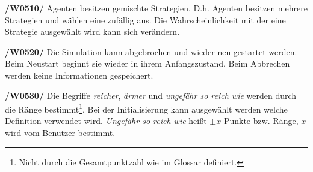 \textbf{/W0510/}
Agenten besitzen gemischte Strategien. D.h. Agenten besitzen mehrere Strategien und wählen eine zufällig aus. Die Wahrscheinlichkeit mit der eine Strategie ausgewählt wird kann sich verändern.

\textbf{/W0520/}
Die Simulation kann abgebrochen und wieder neu gestartet werden. Beim Neustart beginnt sie wieder in ihrem Anfangszustand. Beim Abbrechen werden keine Informationen gespeichert.

\textbf{/W0530/}
Die Begriffe \emph{reicher}, \emph{ärmer} und \emph{ungefähr so reich wie} werden durch die Ränge bestimmt\footnote{Nicht durch die Gesamtpunktzahl wie im Glossar definiert.}. Bei der Initialisierung kann ausgewählt werden welche Definition verwendet wird. \emph{Ungefähr so reich wie} heißt $\pm x$ Punkte bzw. Ränge, $x$ wird vom Benutzer bestimmt.